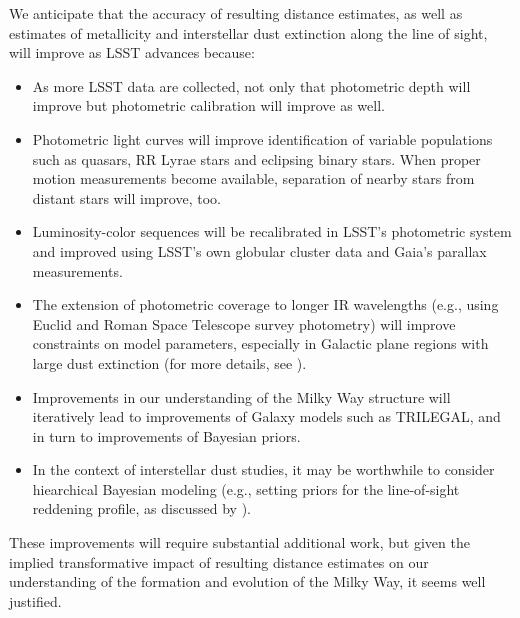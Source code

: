 We anticipate that the accuracy of resulting distance estimates, as well as estimates of metallicity and interstellar dust extinction
along the line of sight, will improve as LSST advances because:
\begin{itemize}
\item As more LSST data are collected, not only that photometric depth will improve but photometric calibration will improve as well.
\item Photometric light curves will improve identification of variable populations such as quasars, RR Lyrae stars and eclipsing
           binary stars. When proper motion measurements become available, separation of nearby stars from distant stars will improve, too. 
\item Luminosity-color sequences will be recalibrated in LSST's photometric system and improved using LSST's own globular cluster data and Gaia's parallax measurements.
\item The extension of photometric coverage to longer IR wavelengths (e.g., using Euclid and Roman Space Telescope survey photometry)
          will improve constraints on model parameters, especially in Galactic plane regions with large dust extinction (for more details,
          see \citealt{2012ApJ...757..166B}).
\item Improvements in our understanding of the Milky Way structure will iteratively lead to improvements of Galaxy models
         such as TRILEGAL, and in turn to improvements of Bayesian priors.
\item In the context of interstellar dust studies, it may be worthwhile to consider hiearchical Bayesian modeling (e.g., setting priors
             for the line-of-sight reddening profile, as discussed by \citealt{2014ApJ...783..114G}). 
\end{itemize}

These improvements will require substantial additional work, but given the implied transformative impact of resulting
distance estimates on our understanding  of the formation and evolution of the Milky Way, it seems well justified.  